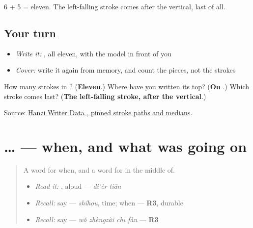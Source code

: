6 + 5 = eleven. The left-falling stroke comes after the vertical, last of all.

\subsection*{Your turn}
\begin{itemize}
\raggedright
  \item \emph{Write it:} , all eleven, with the model in front of you
  \item \emph{Cover:} write it again from memory, and count the pieces, not the strokes
\end{itemize}

\begin{tcolorbox}[breakable,colback=teal!4,colframe=teal!35!black,title={Before you move on}]
How many strokes in ? (\textbf{Eleven}.) Where have you written its top? (\textbf{On }.) Which stroke comes last? (\textbf{The left-falling stroke, after the vertical}.)

Source: \href{https://raw.githubusercontent.com/chanind/hanzi-writer-data/68d10a4b21150cae5e1ebbd223eed289cf32d90c/data/\%E7\%AC\%AC.json}{Hanzi Writer Data , pinned stroke paths and medians}.
\end{tcolorbox}
\section[\texorpdfstring{…\zh{的时候} (… de shíhou)}{…的时候 (… de shíhou)}]{… — when, and what was going on}

\label{lesson:ZH-C279-de-shihou}



\begin{quote}
A word for when, and a word for in the middle of.

\begin{itemize}
\raggedright
  \item \emph{Read it:} , aloud — \emph{dì'èr tiān}
  \item \emph{Recall:} say  — \emph{shíhou}, time; when — \textbf{R3}, durable
  \item \emph{Recall:} say  — \emph{wǒ zhèngzài chī fàn} — \textbf{R3}
\end{itemize}
\end{quote}


